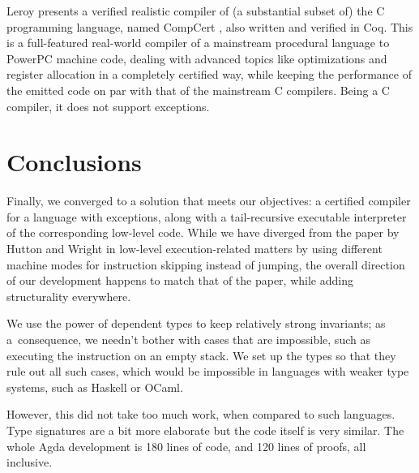 Leroy presents a verified realistic compiler of (a substantial subset of) the C programming language,
named CompCert \cite{leroy09}, also written and verified in Coq. This is a full-featured real-world
compiler of a mainstream procedural language to PowerPC machine code, dealing with advanced topics
like optimizations and register allocation in a completely certified way, while keeping
the performance of the emitted code on par with that of the mainstream C compilers. Being a C
compiler, it does not support exceptions.

\section{Conclusions}

Finally, we converged to a solution that meets our objectives: a certified compiler for a
language with exceptions, along with a tail-recursive executable interpreter of the corresponding
low-level code. While we have diverged from the
paper by Hutton and Wright \cite{gmh:exceptions} in low-level execution-related matters
by using different machine modes for instruction skipping instead of jumping, the overall
direction of our development happens to match that of the paper, while adding
structurality everywhere.

We use the power of dependent types to keep relatively strong invariants; as a~consequence,
we needn't bother with cases that are impossible, such as executing the instruction 
on an empty stack. We set up the types so that they rule out all such cases, which would be
impossible in languages with weaker type systems, such as Haskell or OCaml.

However, this did not take too much work, when compared to such languages.
Type signatures are a bit more elaborate but the code itself is very similar. The whole Agda
development is 180 lines of code, and 120 lines of proofs, all inclusive.

